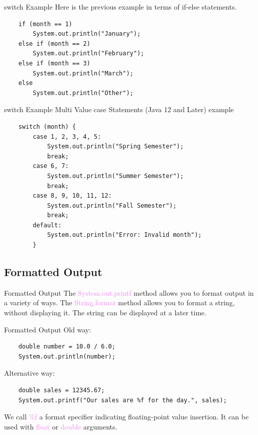 \documentclass[11pt]{beamer}
\newcommand{\violet}[1]{\textcolor{violet}{#1}}
\begin{document}
\begin{frame}[fragile]{switch Example}
    Here is the previous example in terms of if-else statements.
    \begin{lstlisting}
    if (month == 1)
        System.out.println("January");
    else if (month == 2)
        System.out.println("February");
    else if (month == 3)
        System.out.println("March");
    else
        System.out.println("Other");
    \end{lstlisting}
\end{frame}

\begin{frame}[fragile]{switch Example}
    Multi Value case Statements (Java 12 and Later) example
    \begin{lstlisting}
    switch (month) {
        case 1, 2, 3, 4, 5:
            System.out.println("Spring Semester");
            break;
        case 6, 7:
            System.out.println("Summer Semester");
            break;
        case 8, 9, 10, 11, 12:
            System.out.println("Fall Semester");
            break;
        default:
            System.out.println("Error: Invalid month");
        }
    \end{lstlisting}
\end{frame}

\subsection{Formatted Output}
\begin{frame}{Formatted Output}
    The \violet{System.out.printf} method allows you to format output in a variety of ways. The \violet{String.format} method allows you to format a string, without displaying it. The string can be displayed at a later time.
\end{frame}

\begin{frame}[fragile]{Formatted Output}
    Old way:
    \begin{lstlisting}
    double number = 10.0 / 6.0;
    System.out.println(number);
    \end{lstlisting}

    Alternative way:
    \begin{lstlisting}
    double sales = 12345.67;
    System.out.printf("Our sales are %f for the day.", sales);
    \end{lstlisting}

    We call \violet{\%f} a format specifier indicating floating-point value insertion. It can be used with \violet{float} or \violet{double} arguments.
\end{frame}
\end{document}
